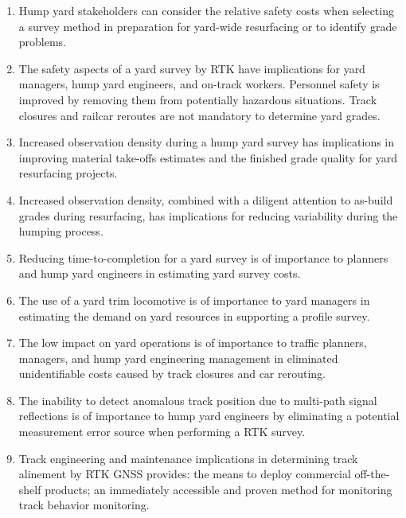 \begin{enumerate}

\item
Hump yard stakeholders can consider the relative safety costs when selecting a survey method in preparation for yard-wide resurfacing or to identify grade problems.

\item
The safety aspects of a yard survey by RTK have implications for yard managers, hump yard engineers, and on-track workers. Personnel safety is improved by removing them from potentially hazardous situations. Track closures and railcar reroutes are not mandatory to determine yard grades.

\item
Increased observation density during a hump yard survey has implications in improving material take-offs estimates and the finished grade quality for yard resurfacing projects.

\item
Increased observation density, combined with a diligent attention to as-build grades during resurfacing, has implications for reducing variability during the humping process.

\item
Reducing time-to-completion for a yard survey is of importance to planners and hump yard engineers in estimating yard survey costs.

\item
The use of a yard trim locomotive is of importance to yard managers in estimating the demand on yard resources in supporting a profile survey.

\item
The low impact on yard operations is of importance to traffic planners, managers, and hump yard engineering management in eliminated unidentifiable costs caused by track closures and car rerouting.

\item
The inability to detect anomalous track position due to multi-path signal reflections is of importance to hump yard engineers by eliminating a potential measurement error source when performing a RTK survey.

\item
Track engineering and maintenance implications in determining track alinement by RTK GNSS provides: the means to deploy commercial off-the-shelf products; an immediately accessible and proven method for monitoring track behavior monitoring. 


\end{enumerate}
